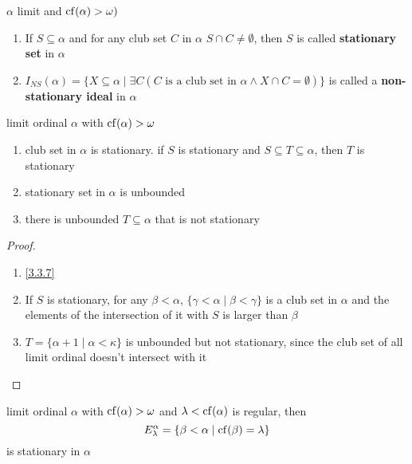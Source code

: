 \documentclass[11pt]{article}
\begin{document}
\begin{definition}[]
\(\alpha\) limit and \(\operatorname{cf}(\alpha)>\omega)\)
\begin{enumerate}
\item If \(S\subseteq\alpha\) and for any club set \(C\) in \(\alpha\) \(S\cap C\neq\emptyset\), then \(S\) is called \textbf{stationary set} in \(\alpha\)
\item \(I_{NS}(\alpha)=\{X\subseteq\alpha\mid\exists C(C\text{ is a club set in $\alpha$}\wedge X\cap C=\emptyset)\}\) is called a \textbf{non-stationary
ideal} in \(\alpha\)
\end{enumerate}
\end{definition}

\begin{proposition}[]
limit ordinal \(\alpha\) with \(\operatorname{cf}(\alpha)>\omega\)
\begin{enumerate}
\item club set in \(\alpha\) is stationary. if \(S\) is stationary and \(S\subseteq T\subseteq\alpha\), then \(T\) is stationary
\item stationary set in \(\alpha\) is unbounded
\item there is unbounded \(T\subseteq\alpha\) that is not stationary
\end{enumerate}
\end{proposition}

\begin{proof}
\begin{enumerate}
\item \ref{3.3.7}
\item If \(S\) is stationary, for any \(\beta<\alpha\), \(\{\gamma<\alpha\mid\beta<\gamma\}\) is a club set in \(\alpha\) and the elements of
the intersection of it with \(S\) is larger than \(\beta\)
\item \(T=\{\alpha+1\mid\alpha<\kappa\}\) is unbounded but not stationary, since the club set of all limit ordinal
doesn't intersect with it
\end{enumerate}
\end{proof}

\begin{proposition}[]
limit ordinal \(\alpha\) with \(\operatorname{cf}(\alpha)>\omega\) and \(\lambda<\operatorname{cf}(\alpha)\) is regular, then
\begin{equation*}
E_\lambda^\alpha=\{\beta<\alpha\mid\operatorname{cf}(\beta)=\lambda\}
\end{equation*}
is stationary in \(\alpha\)
\end{proposition}
\end{document}
